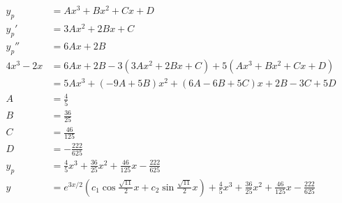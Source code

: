 \documentclass{article}
\begin{document}
\begin{align*}
  y_p         & = A x^3 + B x^2 + C x + D                                                                                                                                               \\
  y_p'        & = 3 A x^2 + 2 B x + C                                                                                                                                                   \\
  y_p''       & = 6 A x + 2 B                                                                                                                                                           \\
  4 x^3 - 2 x & = 6 A x + 2 B - 3 (3 A x^2 + 2 B x + C) + 5 (A x^3 + B x^2 + C x + D)                                                                                                   \\
              & = 5 A x^3 + (-9 A + 5 B) x^2 + (6 A - 6 B + 5 C) x + 2 B - 3 C + 5 D                                                                                                    \\
  A           & = \frac{4}{5}                                                                                                                                                           \\
  B           & = \frac{36}{25}                                                                                                                                                         \\
  C           & = \frac{46}{125}                                                                                                                                                        \\
  D           & = -\frac{222}{625}                                                                                                                                                      \\
  y_p         & = \frac{4}{5} x^3 + \frac{36}{25} x^2 + \frac{46}{125} x - \frac{222}{625}                                                                                              \\
  y           & = e^{3 x / 2} \left( c_1 \cos \frac{\sqrt{11}}{2} x + c_2 \sin \frac{\sqrt{11}}{2} x \right) + \frac{4}{5} x^3 + \frac{36}{25} x^2 + \frac{46}{125} x - \frac{222}{625}
\end{align*}
\end{document}

